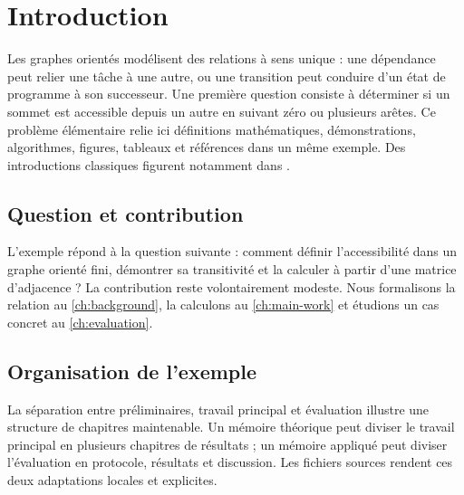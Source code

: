 \chapter{Introduction}
\label{ch:introduction}


Les graphes orientés modélisent des relations à sens unique : une dépendance peut
relier une tâche à une autre, ou une transition peut conduire d'un état de
programme à son successeur. Une première question consiste à déterminer si un
sommet est accessible depuis un autre en suivant zéro ou plusieurs arêtes. Ce
problème élémentaire relie ici définitions mathématiques, démonstrations,
algorithmes, figures, tableaux et références dans un même exemple. Des
introductions classiques figurent notamment dans \cite{diestel2017,cormen2022}.

\section{Question et contribution}

L'exemple répond à la question suivante : comment définir l'accessibilité dans
un graphe orienté fini, démontrer sa transitivité et la calculer à partir d'une
matrice d'adjacence ? La contribution reste volontairement modeste. Nous
formalisons la relation au \cref{ch:background}, la calculons au
\cref{ch:main-work} et étudions un cas concret au \cref{ch:evaluation}.

\section{Organisation de l'exemple}

La séparation entre préliminaires, travail principal et évaluation illustre une
structure de chapitres maintenable. Un mémoire théorique peut diviser le travail
principal en plusieurs chapitres de résultats ; un mémoire appliqué peut diviser
l'évaluation en protocole, résultats et discussion. Les fichiers sources rendent
ces deux adaptations locales et explicites.
